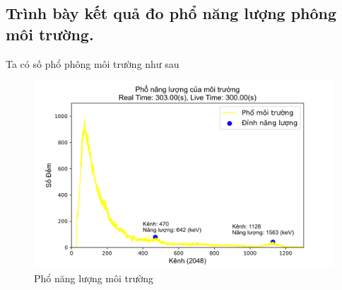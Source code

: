 \documentclass[12pt]{article}
\begin{document}
\newpage
\subsection{Trình bày kết quả đo phổ năng lượng phông môi trường.}

Ta có số phổ phông môi trường như sau

\begin{figure}[h!]
	\includegraphics[width=\textwidth]{Peak-bg}
	\caption{Phổ năng lượng môi trường}
\end{figure}
\end{document}
